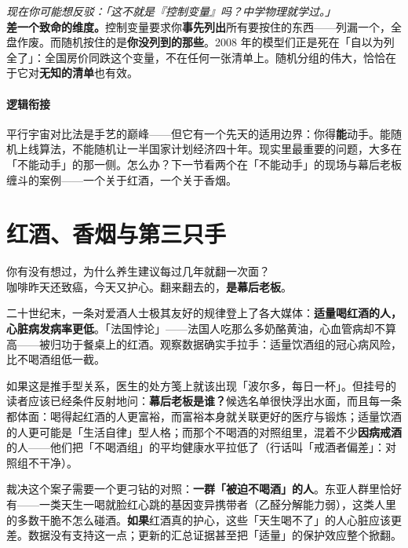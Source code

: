 \documentclass[../../main2.tex]{subfiles}
\begin{document}
	\begin{questionbox}
		\textit{现在你可能想反驳：「这不就是『控制变量』吗？中学物理就学过。」}\\
		\textbf{差一个致命的维度。}控制变量要求你\textbf{事先列出}所有要按住的东西——列漏一个，全盘作废。而随机按住的是\textbf{你没列到的那些}。2008 年的模型们正是死在「自以为列全了」：全国房价同跌这个变量，不在任何一张清单上。随机分组的伟大，恰恰在于它对\textbf{无知的清单}也有效。
	\end{questionbox}

	\paragraph*{逻辑衔接}
	平行宇宙对比法是手艺的巅峰——但它有一个先天的适用边界：你得\textbf{能}动手。能随机上线算法，不能随机让一半国家计划经济四十年。现实里最重要的问题，大多在「不能动手」的那一侧。怎么办？下一节看两个在「不能动手」的现场与幕后老板缠斗的案例——一个关于红酒，一个关于香烟。

	\section{红酒、香烟与第三只手}
	\label{sec:contrib-confound2}

	\begin{readingnote}
		你有没有想过，为什么养生建议每过几年就翻一次面？\\
		咖啡昨天还致癌，今天又护心。翻来翻去的，\textbf{是幕后老板}。
	\end{readingnote}

	二十世纪末，一条对爱酒人士极其友好的规律登上了各大媒体：\textbf{适量喝红酒的人，心脏病发病率更低}。「法国悖论」——法国人吃那么多奶酪黄油，心血管病却不算高——被归功于餐桌上的红酒。观察数据确实手拉手：适量饮酒组的冠心病风险，比不喝酒组低一截。

	如果这是推手型关系，医生的处方笺上就该出现「波尔多，每日一杯」。但挂号的读者应该已经条件反射地问：\textbf{幕后老板是谁？}候选名单很快浮出水面，而且每一条都体面：喝得起红酒的人更富裕，而富裕本身就关联更好的医疗与锻炼；适量饮酒的人更可能是「生活自律」型人格；而那个不喝酒的对照组里，混着不少\textbf{因病戒酒}的人——他们把「不喝酒组」的平均健康水平拉低了（行话叫「戒酒者偏差」：对照组不干净）。

	裁决这个案子需要一个更刁钻的对照：\textbf{一群「被迫不喝酒」的人}。东亚人群里恰好有——一类天生一喝就脸红心跳的基因变异携带者（乙醛分解能力弱），这类人里的多数干脆不怎么碰酒。\textbf{如果}红酒真的护心，这些「天生喝不了」的人心脏应该更差。数据没有支持这一点；更新的汇总证据甚至把「适量」的保护效应整个掀翻。
\end{document}
